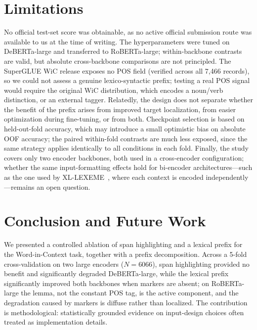 \documentclass[runningheads]{llncs}
\begin{document}
\section{Limitations}
\label{sec:limitations}

No official test-set score was obtainable, as no active official submission
route was available to us at the time of writing. The hyperparameters were tuned on DeBERTa-large and transferred to
RoBERTa-large; within-backbone contrasts are valid, but absolute cross-backbone
comparisons are not principled. The SuperGLUE WiC release exposes no POS field
(verified across all 7{,}466 records), so we could not assess a genuine
lexico-syntactic prefix; testing a real POS signal would require the original
WiC distribution, which encodes a noun/verb distinction, or an external tagger.
Relatedly, the design does not separate whether the benefit of the prefix arises
from improved target localization, from easier optimization during fine-tuning,
or from both. Checkpoint selection is based on held-out-fold accuracy, which may
introduce a small optimistic bias on absolute OOF accuracy; the paired
within-fold contrasts are much less exposed, since the same strategy applies
identically to all conditions in each fold. Finally, the study covers only two encoder
backbones, both used in a
cross-encoder configuration; whether the same input-formatting effects hold for
bi-encoder architectures---such as the one used by
XL-LEXEME~\cite{cassotti2023xllexeme}, where each context is encoded
independently---remains an open question.

\section{Conclusion and Future Work}
\label{sec:conclusion}

We presented a controlled ablation of span highlighting and a lexical prefix for
the Word-in-Context task, together with a prefix decomposition. Across a 5-fold
cross-validation on two large encoders ($N = 6066$), span highlighting provided
no benefit and significantly degraded DeBERTa-large, while the lexical prefix
significantly improved both backbones when markers are absent; on RoBERTa-large
the lemma, not the constant POS tag, is the active component, and the
degradation caused by markers is diffuse rather than localized. The contribution
is methodological: statistically grounded evidence on input-design choices often
treated as implementation details.
\end{document}
